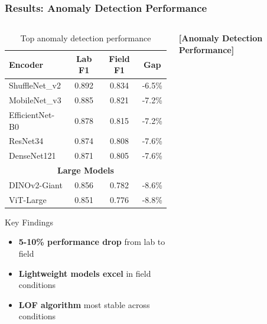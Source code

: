 \documentclass[aspectratio=43]{beamer}
\begin{document}
\begin{frame}
    \frametitle{Results: Anomaly Detection Performance}
    
    \begin{columns}
        \begin{column}{0.5\textwidth}
            \begin{table}[h]
                \centering
                \caption{Top anomaly detection performance}
                \scriptsize
                \begin{tabular}{lccc}
                \toprule
                \textbf{Encoder} & \textbf{Lab F1} & \textbf{Field F1} & \textbf{Gap} \\
                \midrule
                ShuffleNet\_v2 & 0.892 & 0.834 & -6.5\% \\
                MobileNet\_v3 & 0.885 & 0.821 & -7.2\% \\
                EfficientNet-B0 & 0.878 & 0.815 & -7.2\% \\
                ResNet34 & 0.874 & 0.808 & -7.6\% \\
                DenseNet121 & 0.871 & 0.805 & -7.6\% \\
                \midrule
                \multicolumn{4}{c}{\textbf{Large Models}} \\
                DINOv2-Giant & 0.856 & 0.782 & -8.6\% \\
                ViT-Large & 0.851 & 0.776 & -8.8\% \\
                \bottomrule
                \end{tabular}
            \end{table}
            
            \begin{alertblock}{Key Findings}
                \begin{itemize}
                    \item \textbf{5-10\% performance drop} from lab to field
                    \item \textbf{Lightweight models excel} in field conditions
                    \item \textbf{LOF algorithm} most stable across conditions
                \end{itemize}
            \end{alertblock}
        \end{column}
        
        \begin{column}{0.5\textwidth}
            \begin{center}
                \textbf{[Anomaly Detection Performance]}
                

\end{center}
\end{column}
\end{columns}
\end{frame}
\end{document}
